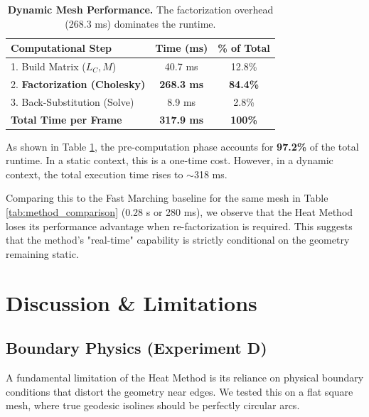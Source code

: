 \documentclass[11pt,a4paper]{article}
\begin{document}
\begin{table}[h]
\centering
\small
\begin{tabular}{@{}lcc@{}}
\toprule
\textbf{Computational Step} & \textbf{Time (ms)} & \textbf{\% of Total} \\
\midrule
1. Build Matrix ($L_C, M$) & 40.7 ms & 12.8\% \\
2. \textbf{Factorization (Cholesky)} & \textbf{268.3 ms} & \textbf{84.4\%} \\
3. Back-Substitution (Solve) & 8.9 ms & 2.8\% \\
\midrule
\textbf{Total Time per Frame} & \textbf{317.9 ms} & \textbf{100\%} \\
\bottomrule
\end{tabular}
\caption{\textbf{Dynamic Mesh Performance.} The factorization overhead (268.3 ms) dominates the runtime.}
\label{tab:dynamic_bottleneck}
\end{table}

As shown in Table \ref{tab:dynamic_bottleneck}, the pre-computation phase accounts for \textbf{97.2\%} of the total runtime. In a static context, this is a one-time cost. However, in a dynamic context, the total execution time rises to $\sim$318 ms. 

Comparing this to the Fast Marching baseline for the same mesh in Table \ref{tab:method_comparison} (0.28 s or 280 ms), we observe that the Heat Method loses its performance advantage when re-factorization is required. This suggests that the method's "real-time" capability is strictly conditional on the geometry remaining static.

\section{Discussion \& Limitations}

\subsection{Boundary Physics (Experiment D)}
A fundamental limitation of the Heat Method is its reliance on physical boundary conditions that distort the geometry near edges. We tested this on a flat square mesh, where true geodesic isolines should be perfectly circular arcs.
\end{document}
